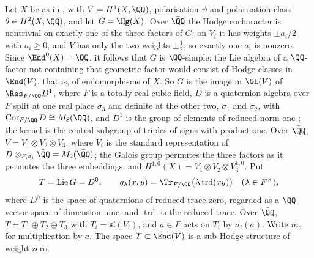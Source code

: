 \begin{setupenv}\label{setup:mumford}
Let $X$ be as in , with $V=H^{1}(X,\QQ)$,
polarisation $\psi$ and polarisation class $\theta\in H^{2}(X,\QQ)$, and let
$G=\Hg(X)$. Over $\bar{\QQ}$ the Hodge cocharacter is nontrivial on exactly
one of the three factors of $G$: on $V_{i}$ it has weights $\pm a_{i}/2$ with
$a_{i}\ge0$, and $V$ has only the two weights $\pm\frac12$, so exactly one
$a_{i}$ is nonzero. Since $\End^{0}(X)=\QQ$, it follows that $G$ is
$\QQ$-simple: the Lie algebra of a $\QQ$-factor not containing that geometric
factor would consist of Hodge classes in $\End(V)$, that is, of endomorphisms
of $X$. So $G$ is the image in
$\GL(V)$ of $\Res_{F/\QQ}D^{1}$, where $F$ is a totally real cubic field, $D$
is a quaternion algebra over $F$ split at one real place $\sigma_{3}$ and
definite at the other two, $\sigma_{1}$ and $\sigma_{2}$, with
$\operatorname{Cor}_{F/\QQ}D\cong M_{8}(\QQ)$, and $D^{1}$ is the group of
elements of reduced norm one \cite{Mum69,Gal00}; the kernel is the central
subgroup of triples of signs with product one. Over $\bar{\QQ}$,
$V=V_{1}\otimes V_{2}\otimes V_{3}$, where $V_{i}$ is the standard
representation of $D\otimes_{F,\sigma_{i}}\bar{\QQ}=M_{2}(\bar{\QQ})$; the
Galois group permutes the three factors as it permutes the three embeddings,
and $H^{1,0}(X)=V_{1}\otimes V_{2}\otimes V_{3}^{1,0}$. Put
\[
  T=\operatorname{Lie}G=D^{0},
  \qquad
  q_{\lambda}(x,y)=\Tr_{F/\QQ}\bigl(\lambda\operatorname{trd}(xy)\bigr)
  \quad(\lambda\in F^{\times}),
\]
where $D^{0}$ is the space of quaternions of reduced trace zero, regarded as
a $\QQ$-vector space of dimension nine, and $\operatorname{trd}$ is the
reduced trace. Over $\bar{\QQ}$, $T=T_{1}\oplus T_{2}\oplus T_{3}$ with
$T_{i}=\mathfrak{sl}(V_{i})$, and $a\in F$ acts on $T_{i}$ by $\sigma_{i}(a)$.
Write $m_{a}$ for multiplication by $a$. The space $T\subset\End(V)$ is a
sub-Hodge structure of weight zero.
\end{setupenv}

